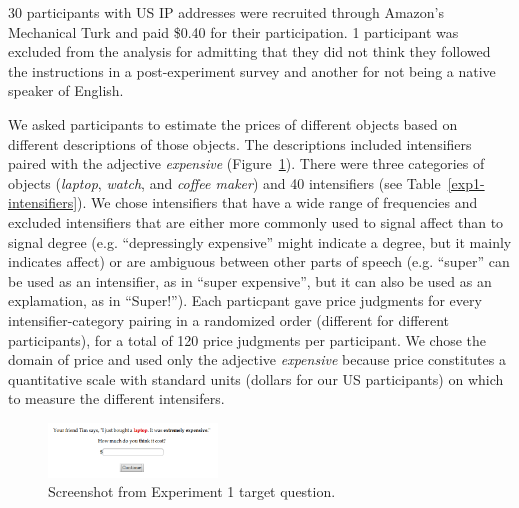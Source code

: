 \documentclass[10pt,letterpaper]{article}
\newcommand{\w}[1]{\emph{#1}}
\begin{document}
30 participants with US IP addresses were recruited through Amazon's Mechanical Turk and paid \$0.40 for their participation. 1 participant was excluded from the analysis for admitting that they did not think they followed the instructions in a post-experiment survey and another for not being a native speaker of English.

We asked participants to estimate the prices of different objects based on different descriptions of those objects. The descriptions included intensifiers paired with the adjective \w{expensive} (Figure~\ref{exp1-q}).
There were three categories of objects (\emph{laptop}, \emph{watch}, and \emph{coffee maker}) and 40 intensifiers (see Table~\ref{exp1-intensifiers}).
We chose intensifiers that have a wide range of frequencies and excluded intensifiers that are either more commonly used to signal affect than to signal degree (e.g. ``depressingly expensive'' might indicate a degree, but it mainly indicates affect) or are ambiguous between other parts of speech (e.g. ``super'' can be used as an intensifier, as in ``super expensive'', but it can also be used as an explamation, as in ``Super!'').
Each particpant gave price judgments for every intensifier-category pairing in a randomized order (different for different participants), for a total of 120 price judgments per participant.
We chose the domain of price and used only the adjective \w{expensive} because price constitutes a quantitative scale with standard units (dollars for our US participants) on which to measure the different intensifers.

\begin{figure}[ht]
\begin{center}
\includegraphics[width=0.4\textwidth]{exp1-q.png}
\end{center}
\caption{Screenshot from Experiment 1 target question.} 
\label{exp1-q}
\end{figure}
\end{document}
